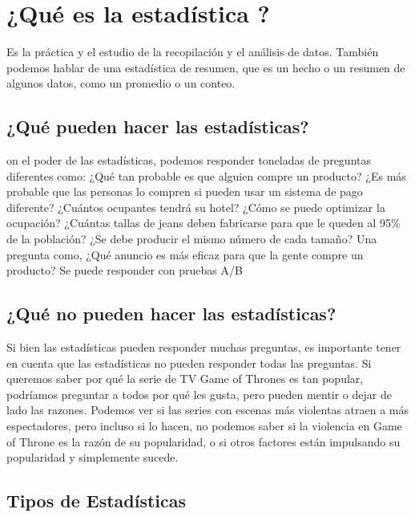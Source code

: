 \documentclass[
  letterpaper,
  DIV=11,
  numbers=noendperiod]{scrreprt}
\begin{document}
\hypertarget{quuxe9-es-la-estaduxedstica}{%
\section{¿Qué es la estadística ?}\label{quuxe9-es-la-estaduxedstica}}

Es la práctica y el estudio de la recopilación y el análisis de datos.
También podemos hablar de una estadística de resumen, que es un hecho o
un resumen de algunos datos, como un promedio o un conteo.

\hypertarget{quuxe9-pueden-hacer-las-estaduxedsticas}{%
\subsection{¿Qué pueden hacer las
estadísticas?}\label{quuxe9-pueden-hacer-las-estaduxedsticas}}

on el poder de las estadísticas, podemos responder toneladas de
preguntas diferentes como: ¿Qué tan probable es que alguien compre un
producto? ¿Es más probable que las personas lo compren si pueden usar un
sistema de pago diferente? ¿Cuántos ocupantes tendrá su hotel? ¿Cómo se
puede optimizar la ocupación? ¿Cuántas tallas de jeans deben fabricarse
para que le queden al 95\% de la población? ¿Se debe producir el mismo
número de cada tamaño? Una pregunta como, ¿Qué anuncio es más eficaz
para que la gente compre un producto? Se puede responder con pruebas A/B

\hypertarget{quuxe9-no-pueden-hacer-las-estaduxedsticas}{%
\subsection{¿Qué no pueden hacer las
estadísticas?}\label{quuxe9-no-pueden-hacer-las-estaduxedsticas}}

Si bien las estadísticas pueden responder muchas preguntas, es
importante tener en cuenta que las estadísticas no pueden responder
todas las preguntas. Si queremos saber por qué la serie de TV Game of
Thrones es tan popular, podríamos preguntar a todos por qué les gusta,
pero pueden mentir o dejar de lado las razones. Podemos ver si las
series con escenas más violentas atraen a más espectadores, pero incluso
si lo hacen, no podemos saber si la violencia en Game of Throne es la
razón de su popularidad, o si otros factores están impulsando su
popularidad y simplemente sucede.

\hypertarget{tipos-de-estaduxedsticas}{%
\subsection{Tipos de Estadísticas}\label{tipos-de-estaduxedsticas}}
\end{document}
